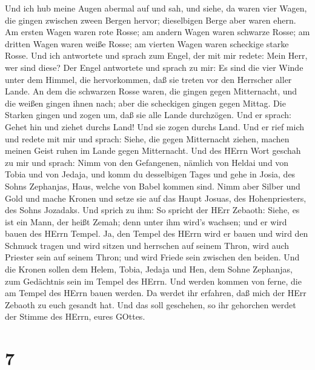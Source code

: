  Und ich hub meine Augen abermal auf und sah, und siehe, da
waren vier Wagen, die gingen zwischen zween Bergen hervor; dieselbigen
Berge aber waren ehern.  Am ersten Wagen waren rote Rosse;
am andern Wagen waren schwarze Rosse;  am dritten Wagen
waren weiße Rosse; am vierten Wagen waren scheckige starke Rosse.
 Und ich antwortete und sprach zum Engel, der mit mir
redete: Mein Herr, wer sind diese?  Der Engel antwortete und
sprach zu mir: Es sind die vier Winde unter dem Himmel, die
hervorkommen, daß sie treten vor den Herrscher aller Lande. 
An dem die schwarzen Rosse waren, die gingen gegen Mitternacht, und die
weißen gingen ihnen nach; aber die scheckigen gingen gegen Mittag.
 Die Starken gingen und zogen um, daß sie alle Lande
durchzögen. Und er sprach: Gehet hin und ziehet durchs Land! Und sie
zogen durchs Land.  Und er rief mich und redete mit mir und
sprach: Siehe, die gegen Mitternacht ziehen, machen meinen Geist ruhen
im Lande gegen Mitternacht.  Und des HErrn Wort geschah zu
mir und sprach:  Nimm von den Gefangenen, nämlich von
Heldai und von Tobia und von Jedaja, und komm du desselbigen Tages und
gehe in Josia, des Sohns Zephanjas, Haus, welche von Babel kommen sind.
 Nimm aber Silber und Gold und mache Kronen und setze sie
auf das Haupt Josuas, des Hohenpriesters, des Sohns Jozadaks.
 Und sprich zu ihm: So spricht der HErr Zebaoth: Siehe, es
ist ein Mann, der heißt Zemah; denn unter ihm wird's wachsen; und er
wird bauen des HErrn Tempel.  Ja, den Tempel des HErrn wird
er bauen und wird den Schmuck tragen und wird sitzen und herrschen auf
seinem Thron, wird auch Priester sein auf seinem Thron; und wird Friede
sein zwischen den beiden.  Und die Kronen sollen dem Helem,
Tobia, Jedaja und Hen, dem Sohne Zephanjas, zum Gedächtnis sein im
Tempel des HErrn.  Und werden kommen von ferne, die am
Tempel des HErrn bauen werden. Da werdet ihr erfahren, daß mich der HErr
Zebaoth zu euch gesandt hat. Und das soll geschehen, so ihr gehorchen
werdet der Stimme des HErrn, eures GOttes.

\hypertarget{section-6}{%
\section{7}\label{section-6}}

